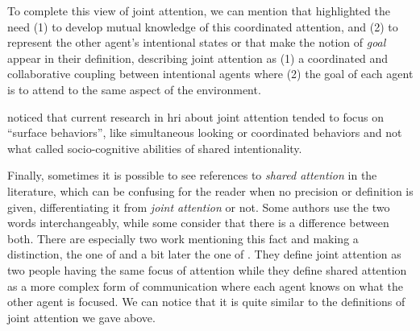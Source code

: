 \documentclass[a4paper,11pt,twoside]{StyleThese}
\begin{document}
To complete this view of joint attention, we can mention \cite{carpenter_2011_joint} that highlighted the need (1) to develop mutual knowledge of this coordinated attention, and (2) to represent the other agent’s intentional states or \cite{kaplan_2006_challenges} that make the notion of \emph{goal} appear in their definition, describing joint attention as (1) a coordinated and collaborative coupling between intentional agents where (2) the goal of each agent is to attend to the same aspect of the environment.

\cite{kaplan_2006_challenges} noticed that current research in \acrshort{hri} about joint attention tended to focus on ``surface behaviors'', like simultaneous looking or coordinated behaviors and not what \cite{tomasello_2007_shared} called socio-cognitive abilities of shared intentionality.

Finally, sometimes it is possible to see references to \emph{shared attention} in the literature, which can be confusing for the reader when no precision or definition is given, differentiating it from \emph{joint attention} or not. Some authors use the two words interchangeably, while some consider that there is a difference between both. There are especially two work mentioning this fact and making a distinction, the one of \cite{emery_2000_eyes} and a bit later the one of \cite{triesch_2006_gaze}. They define joint attention as two people having the same focus of attention while they define shared attention as a more complex form of communication where each agent knows on what the other agent is focused. We can notice that it is quite similar to the definitions of joint attention we gave above.
\end{document}
